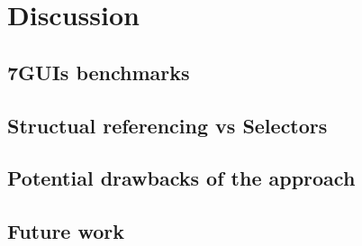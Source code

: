 \chapter{Discussion}
\label{chap:discussion}


\section{7GUIs benchmarks}
\section{Structual referencing vs Selectors}
\section{Potential drawbacks of the approach}
\section{Future work}

